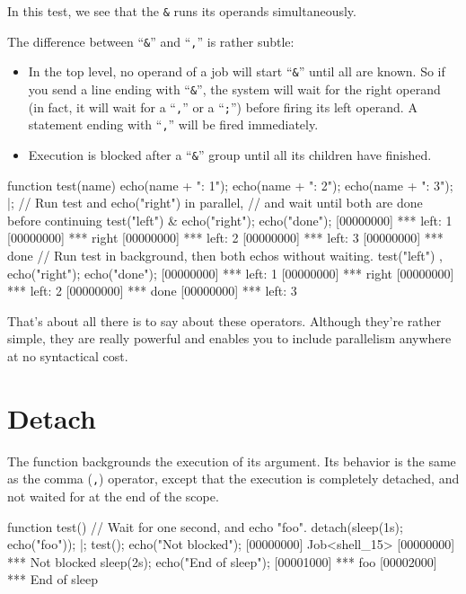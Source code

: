 In this test, we see that the \lstinline{&} runs its operands
simultaneously.

The difference between ``\lstinline{&}'' and ``\lstinline{,}'' is
rather subtle:

\begin{itemize}
\item In the top level, no operand of a job will start ``\lstinline{&}''
  until all are known.  So if you send a line ending with ``\lstinline{&}'',
  the system will wait for the right operand (in fact, it will wait for a
  ``\lstinline{,}'' or a ``\lstinline{;}'') before firing its left operand.
  A statement ending with ``\lstinline{,}'' will be fired immediately.
\item Execution is blocked after a ``\lstinline{&}'' group until all
  its children have finished.
\end{itemize}

\begin{urbiscript}[firstnumber=1]
function test(name)
{
  echo(name + ": 1");
  echo(name + ": 2");
  echo(name + ": 3");
}|;
// Run test and echo("right") in parallel,
// and wait until both are done before continuing
test("left") & echo("right"); echo("done");
[00000000] *** left: 1
[00000000] *** right
[00000000] *** left: 2
[00000000] *** left: 3
[00000000] *** done
// Run test in background, then both echos without waiting.
test("left") , echo("right"); echo("done");
[00000000] *** left: 1
[00000000] *** right
[00000000] *** left: 2
[00000000] *** done
[00000000] *** left: 3
\end{urbiscript}

That's about all there is to say about these operators. Although
they're rather simple, they are really powerful and enables you to
include parallelism anywhere at no syntactical cost.

\section{Detach}

The  function backgrounds the execution of
its argument. Its behavior is the same as the comma (\lstinline{,})
operator, except that the execution is completely detached, and not
waited for at the end of the scope.

\begin{urbiscript}[firstnumber=1]
function test()
{
  // Wait for one second, and echo "foo".
  detach({sleep(1s); echo("foo")});
}|;
test();
echo("Not blocked");
[00000000] Job<shell_15>
[00000000] *** Not blocked
sleep(2s);
echo("End of sleep");
[00001000] *** foo
[00002000] *** End of sleep
\end{urbiscript}

